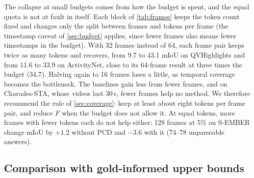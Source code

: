 The collapse at small budgets comes from how the budget is spent, and the equal quota is not at fault in itself. Each
block of \cref{tab:frames} keeps the token count fixed and changes only the split between frames and tokens per frame
(the timestamp caveat of \cref{sec:budget} applies, since fewer frames also means fewer timestamps in the budget).
With 32 frames instead of 64, each frame pair keeps twice as many tokens and \method recovers, from 9.7 to 43.1 mIoU on
QVHighlights and from 11.6 to 33.9 on ActivityNet, close to its 64-frame result at three times the budget (34.7).
Halving again to 16 frames loses a little, as temporal coverage becomes the bottleneck. The baselines gain less from
fewer frames, and on Charades-STA, whose videos last 30\,s, fewer frames help no method. We therefore recommend the
rule of \cref{sec:coverage}: keep at least about eight tokens per frame pair, and reduce $F$ when the budget does not
allow it. At equal tokens, more frames with fewer tokens each do not help either: 128 frames at 5\% on S-EMBER change mIoU by $+1.2$
without PCD and $-3.6$ with it (74--78 unparseable answers).

\subsection{Comparison with gold-informed upper bounds}
\label{sec:oracles}


